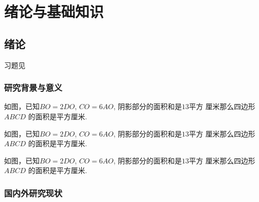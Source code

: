 \documentclass{USTBBook}
\begin{document}
\makeCover

\frontmatter
\pagestyle{fancy}

\setcounter{page}{0}
\cleardoublepage
{}

\tableofcontents

\mainmatter

\part{绪论与基础知识}

\chapter{绪论}

\begin{flushright}
   习题见 
\end{flushright}

\zhlipsum[1]

\section*{研究背景与意义}


\zhlipsum[2]

\begin{question*}
  \taskGrade
  如图，已知$BO=2DO$, $CO=6AO$, 阴影部分的面积和是$13$平方
  厘米那么四边形 $ABCD$ 的面积是\fillin[]平方厘米.
\end{question*}

\begin{question}
  \taskGrade[2]
  如图，已知$BO=2DO$, $CO=6AO$, 阴影部分的面积和是$13$平方
  厘米那么四边形 $ABCD$ 的面积是\fillin[]平方厘米.
\end{question}

\begin{question}
  \taskGrade[5]
  如图，已知$BO=2DO$, $CO=6AO$, 阴影部分的面积和是$13$平方
  厘米那么四边形 $ABCD$ 的面积是\fillin[]平方厘米.
\end{question}

\newpage


\zhlipsum[6-7]

\newpage
\section{国内外研究现状}
\end{document}
